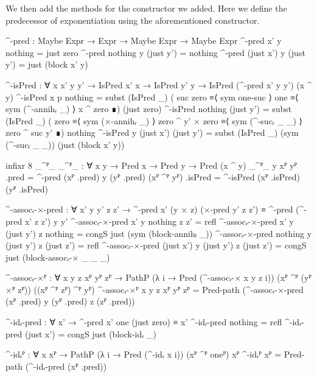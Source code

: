 We then add the methods for the constructor we added. Here we define the
predecessor of exponentiation using the aforementioned
 constructor.
\begin{code}
  ^-pred :
    Maybe Expr → Expr → Maybe Expr → Maybe Expr
  ^-pred x'         y nothing    = just zero
  ^-pred nothing    y (just y')  = nothing
  ^-pred (just x')  y (just y')  = just (block x' y)
\end{code}
\begin{code}[hide]
  ^-isPred :
    ∀ {x x' y y'} →
    IsPred x' x → IsPred y' y → IsPred (^-pred x' y y') (x ^ y)
  ^-isPred {x} p nothing =
    subst (IsPred _)
      ( suc zero ≡⟨ sym one-suc ⟩
        one      ≡⟨ sym (^-annihᵣ _) ⟩
        x ^ zero ∎)
      (just zero)
  ^-isPred nothing (just y') =
    subst (IsPred _)
      ( zero             ≡⟨ sym (×-annihᵣ _) ⟩
        zero ^ y' × zero ≡⟨ sym (^-sucᵣ _ _) ⟩
        zero ^ suc y'    ∎)
      nothing
  ^-isPred {y} (just x') (just y') =
    subst (IsPred _) (sym (^-sucₗ _ _)) (just (block x' y))

  infixr 8 _^ᴾ_
  _^ᴾ_ : ∀ {x y} → Pred x → Pred y → Pred (x ^ y)
  _^ᴾ_ {y} xᴾ yᴾ .pred = ^-pred (xᴾ .pred) y (yᴾ .pred)
  (xᴾ ^ᴾ yᴾ) .isPred = ^-isPred (xᴾ .isPred) (yᴾ .isPred)

  ^-assocᵣ-×-pred :
    ∀ x' y y' z z' →
    ^-pred x' (y × z) (×-pred y' z z') ≡ ^-pred (^-pred x' z z') y y'
  ^-assocᵣ-×-pred x' y nothing z z' = refl
  ^-assocᵣ-×-pred x' y (just y') z nothing = congS just (sym (block-annihₗ _))
  ^-assocᵣ-×-pred nothing y (just y') z (just z') = refl
  ^-assocᵣ-×-pred (just x') y (just y') z (just z') =
    congS just (block-assocᵣ-× _ _ _)

  ^-assocᵣ-×ᴾ :
    ∀ {x y z} xᴾ yᴾ zᴾ →
    PathP (λ i → Pred (^-assocᵣ-× x y z i))
      (xᴾ ^ᴾ (yᴾ ×ᴾ zᴾ)) ((xᴾ ^ᴾ zᴾ) ^ᴾ yᴾ)
  ^-assocᵣ-×ᴾ {x} {y} {z} xᴾ yᴾ zᴾ =
    Pred-path (^-assocᵣ-×-pred (xᴾ .pred) y (yᴾ .pred) z (zᴾ .pred))

  ^-idᵣ-pred : ∀ x' → ^-pred x' one (just zero) ≡ x'
  ^-idᵣ-pred nothing = refl
  ^-idᵣ-pred (just x') = congS just (block-idᵣ _)

  ^-idᵣᴾ : ∀ {x} xᴾ → PathP (λ i → Pred (^-idᵣ x i)) (xᴾ ^ᴾ oneᴾ) xᴾ
  ^-idᵣᴾ xᴾ = Pred-path (^-idᵣ-pred (xᴾ .pred))


\end{code}
